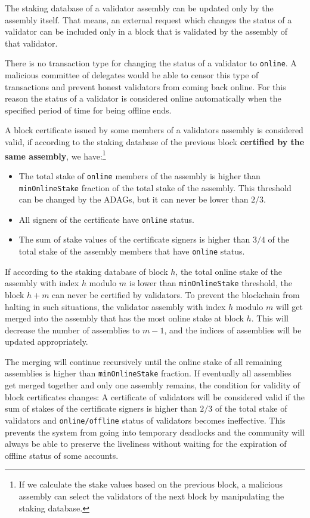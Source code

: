 The staking database of a validator assembly can be updated only by the assembly itself. That means, an external
request which changes the status of a validator can be included only in a block that is validated by the assembly of
that validator.

There is no transaction type for changing the status of a validator to \texttt{online}. A malicious committee
of delegates would be able to censor this type of transactions and prevent honest validators from coming back online.
For this reason the status of a validator is considered online automatically when the specified period of time for
being offline ends.

A block certificate issued by some members of a validators assembly is considered valid, if according to
the staking database of the previous block \textbf{certified by the same assembly}, we have:\footnote{If we calculate
the stake values based on the previous block, a malicious assembly can select the validators of the next block by
manipulating the staking database.}
\begin{itemize}
    \item The total stake of \texttt{online} members of the assembly is higher than \texttt{minOnlineStake} fraction
    of the total stake of the assembly. This threshold can be changed by the ADAGs, but it can never be lower
    than $2/3$.
    \item All signers of the certificate have \texttt{online} status.
    \item The sum of stake values of the certificate signers is higher than $3/4$ of the total stake
    of the assembly members that have \texttt{online} status.
\end{itemize}

If according to the staking database of block $h$, the total online stake of the assembly with index $h$ modulo $m$ is
lower than \texttt{minOnlineStake} threshold, the block $h + m$ can never be certified by validators. To prevent the
blockchain from halting in such situations, the validator assembly with index $h$ modulo $m$ will get merged into the
assembly that has the most online stake at block $h$. This will decrease the number of assemblies to $m-1$, and the
indices of assemblies will be updated appropriately.

The merging will continue recursively until the online stake of all remaining assemblies is higher than
\texttt{minOnlineStake} fraction.
If eventually all assemblies get merged together and only one assembly remains, the condition
for validity of block certificates changes: A certificate of validators will be considered valid if the sum of stakes
of the certificate signers is higher than $2/3$ of the total stake of validators and \texttt{online/offline}
status of validators becomes ineffective. This prevents the system from going into temporary deadlocks and the
community will always be able to preserve the liveliness without waiting for the expiration of offline status of
some accounts.

